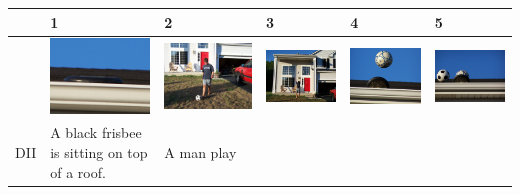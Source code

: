 \begin{table}[h!]
\small
\centering
\begin{tabular}{lp{}p{}p{}p{}p{}}
\toprule
    & \textbf{1} & \textbf{2} & \textbf{3} & \textbf{4} & \textbf{5} \\
\midrule
& \includegraphics[width=\linewidth]{pictures/sind1.jpg} & \includegraphics[width=\linewidth]{pictures/sind2.jpg} & \includegraphics[width=\linewidth]{pictures/sind3.jpg} & \includegraphics[width=\linewidth]{pictures/sind4.jpg} & \includegraphics[width=\linewidth]{pictures/sind5.jpg} \\
\midrule
DII & A black frisbee is sitting on top of a roof. & A man play
\end{tabular}
\end{table}
